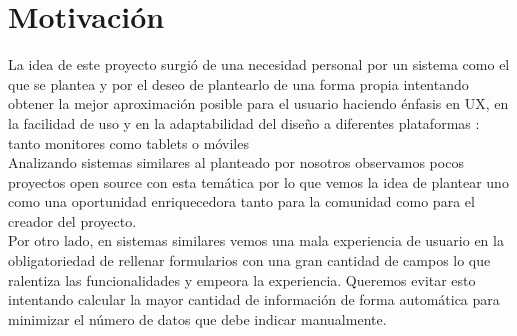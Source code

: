 \documentclass[12pt, a4paper, twoside]{book}
\begin{document}
	\chapter{Motivación}
	La idea de este proyecto surgió de una necesidad personal por un sistema como el que se
	plantea y por el deseo de plantearlo de una forma propia intentando obtener la mejor
	aproximación posible para el usuario haciendo énfasis en UX, en la facilidad de uso y en la
	adaptabilidad del diseño a diferentes plataformas : tanto monitores como tablets o móviles\\
	Analizando sistemas similares al planteado por nosotros observamos pocos proyectos open
	source con esta temática por lo que vemos la idea de plantear uno como una oportunidad
	enriquecedora tanto para la comunidad como para el creador del proyecto.\\
	Por otro lado, en sistemas similares vemos una mala experiencia de usuario en la
	obligatoriedad de rellenar formularios con una gran cantidad de campos lo que ralentiza las
	funcionalidades y empeora la experiencia. Queremos evitar esto intentando calcular la mayor
	cantidad de información de forma automática para minimizar el número de datos que debe
	indicar manualmente.
\end{document}
